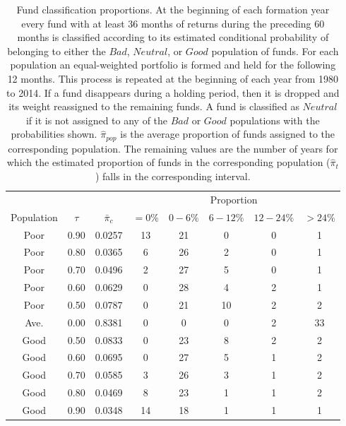 		\begin{table}[p]
			\centering
			\small
			\begin{tabular}{*{8}{c}}
			\toprule
			& & &\multicolumn{5}{c}{Proportion} \\
			\cmidrule{4-8}
			Population & $\tau$ & $\bar{\pi}_c$ & $=0\%$ & $0-6\%$ & $6-12\%$ & $12-24\%$ & $>24\%$ \\
			\midrule
			Poor & 0.90 & 0.0257 &    13 &    21 &     0 &     0 &     1 \\
			Poor & 0.80 & 0.0365 &     6 &    26 &     2 &     0 &     1 \\
			Poor & 0.70 & 0.0496 &     2 &    27 &     5 &     0 &     1 \\
			Poor & 0.60 & 0.0629 &     0 &    28 &     4 &     2 &     1 \\
			Poor & 0.50 & 0.0787 &     0 &    21 &    10 &     2 &     2 \\
			Ave. & 0.00 & 0.8381 &     0 &     0 &     0 &     2 &    33 \\
			Good & 0.50 & 0.0833 &     0 &    23 &     8 &     2 &     2 \\
			Good & 0.60 & 0.0695 &     0 &    27 &     5 &     1 &     2 \\
			Good & 0.70 & 0.0585 &     3 &    26 &     3 &     1 &     2 \\
			Good & 0.80 & 0.0469 &     8 &    23 &     1 &     1 &     2 \\
			Good & 0.90 & 0.0348 &    14 &    18 &     1 &     1 &     1 \\
			\bottomrule
			\end{tabular}
			\captionsetup{position=below, font=footnotesize, justification=justified, width=0.86\linewidth}
			\caption[Fund classification proportions]{Fund classification proportions. At the beginning of each formation year every fund with at least 36 months of returns during the preceding 60 months is classified according to its estimated conditional probability of belonging to either the $Bad$, $Neutral$, or $Good$ population of funds.  For each population an equal-weighted portfolio is formed and held for the following 12 months.  This process is repeated at the beginning of each year from 1980 to 2014.  If a fund disappears during a holding period, then it is dropped and its weight reassigned to the remaining funds.  A fund is classified as $Neutral$ if it is not assigned to any of the $Bad$ or $Good$ populations with the probabilities shown. $\hat{\pi}_{pop}$ is the average proportion of funds assigned to the corresponding population.  The remaining values are the number of years for which the estimated proportion of funds in the corresponding population ($\hat{\pi}_t$) falls in the corresponding interval.}
			\label{tab:proportions}
		\end{table}

